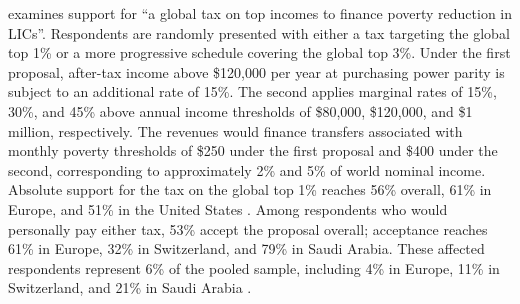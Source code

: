 \documentclass[11pt,a4paper]{article}
\begin{document}
\citet{fabre_public_2026} examines support for ``a global tax on top incomes to finance poverty reduction in LICs''. Respondents are randomly presented with either a tax targeting the global top 1\% or a more progressive schedule covering the global top 3\%. Under the first proposal, after-tax income above \$120,000 per year at purchasing power parity is subject to an additional rate of 15\%. The second applies marginal rates of 15\%, 30\%, and 45\% above annual income thresholds of \$80,000, \$120,000, and \$1 million, respectively. The revenues would finance transfers associated with monthly poverty thresholds of \$250 under the first proposal and \$400 under the second, corresponding to approximately 2\% and 5\% of world nominal income. Absolute support for the tax on the global top 1\% reaches 56\% overall, 61\% in Europe, and 51\% in the United States \citep[Figure S40]{fabre_public_2026}. Among respondents who would personally pay either tax, 53\% accept the proposal overall; acceptance reaches 61\% in Europe, 32\% in Switzerland, and 79\% in Saudi Arabia. These affected respondents represent 6\% of the pooled sample, including 4\% in Europe, 11\% in Switzerland, and 21\% in Saudi Arabia \citep[Figure S41]{fabre_public_2026}.
\end{document}
